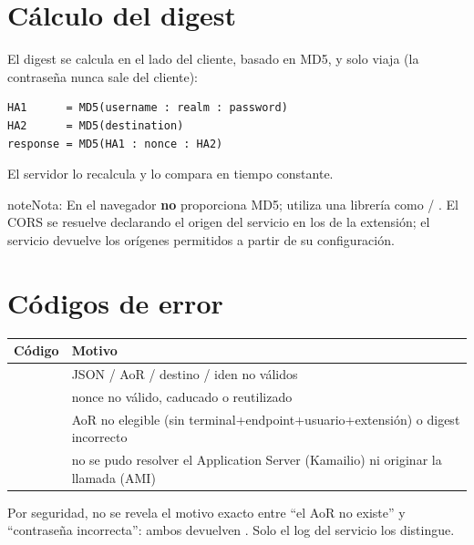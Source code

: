 \documentclass[letterpaper,10pt,spanish]{sphinxmanual}
\begin{document}
\section{Cálculo del digest}
\label{api_rest/click2call:digest-computation}
El digest se calcula en el lado del cliente, basado en MD5, y solo viaja  (la contraseña nunca sale del cliente):

\begin{Verbatim}[commandchars=\\\{\}]
HA1      = MD5(username : realm : password)
HA2      = MD5(destination)
response = MD5(HA1 : nonce : HA2)
\end{Verbatim}

El servidor lo recalcula y lo compara en tiempo constante.

\begin{notice}{note}{Nota:}
En el navegador  \textbf{no} proporciona MD5; utiliza una librería como  / . El CORS se resuelve declarando el origen del servicio en los  de la extensión; el servicio devuelve los orígenes permitidos a partir de su configuración.
\end{notice}


\section{Códigos de error}
\label{api_rest/click2call:error-codes}
\noindent\begin{tabulary}{\linewidth}{|L|L|}
\hline
\textsf{\relax 
Código
\unskip}\relax &\textsf{\relax 
Motivo
\unskip}\relax \\
\hline
{}
&
JSON / AoR / destino / iden no válidos
\\
\hline
{}
&
nonce no válido, caducado o reutilizado
\\
\hline
{}
&
AoR no elegible (sin terminal+endpoint+usuario+extensión) o digest incorrecto
\\
\hline
{}
&
no se pudo resolver el Application Server (Kamailio) ni originar la llamada (AMI)
\\
\hline\end{tabulary}


Por seguridad, no se revela el motivo exacto entre ``el AoR no existe'' y ``contraseña incorrecta'': ambos devuelven . Solo el log del servicio los distingue.
\end{document}
